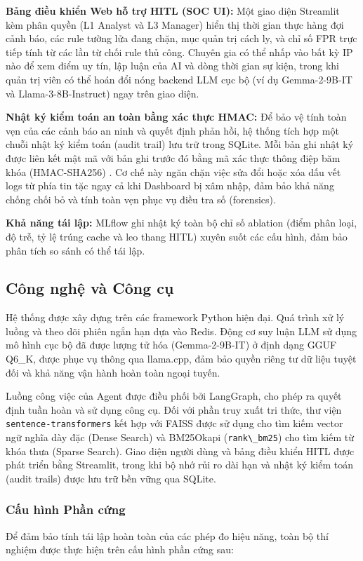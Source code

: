 \documentclass[12pt,a4paper]{article}
\begin{document}
\textbf{Bảng điều khiển Web hỗ trợ HITL (SOC UI):} Một giao diện Streamlit kèm phân quyền (L1 Analyst và L3 Manager) hiển thị thời gian thực hàng đợi cảnh báo, các rule tường lửa đang chặn, mục quản trị cách ly, và chỉ số FPR trực tiếp tính từ các lần từ chối rule thủ công. Chuyên gia có thể nhấp vào bất kỳ IP nào để xem điểm uy tín, lập luận của AI và dòng thời gian sự kiện, trong khi quản trị viên có thể hoán đổi nóng backend LLM cục bộ (ví dụ Gemma-2-9B-IT và Llama-3-8B-Instruct) ngay trên giao diện.

\textbf{Nhật ký kiểm toán an toàn bằng xác thực HMAC:} Để bảo vệ tính toàn vẹn của các cảnh báo an ninh và quyết định phản hồi, hệ thống tích hợp một chuỗi nhật ký kiểm toán (audit trail) lưu trữ trong SQLite. Mỗi bản ghi nhật ký được liên kết mật mã với bản ghi trước đó bằng mã xác thực thông điệp băm khóa (HMAC-SHA256) \cite{hmac1997}. Cơ chế này ngăn chặn việc sửa đổi hoặc xóa dấu vết logs từ phía tin tặc ngay cả khi Dashboard bị xâm nhập, đảm bảo khả năng chống chối bỏ và tính toàn vẹn phục vụ điều tra số (forensics).

\textbf{Khả năng tái lập:} MLflow ghi nhật ký toàn bộ chỉ số ablation (điểm phân loại, độ trễ, tỷ lệ trúng cache và leo thang HITL) xuyên suốt các cấu hình, đảm bảo phân tích so sánh có thể tái lập.

\subsection{Công nghệ và Công cụ}
Hệ thống được xây dựng trên các framework Python hiện đại. Quá trình xử lý luồng và theo dõi phiên ngắn hạn dựa vào Redis. Động cơ suy luận LLM sử dụng mô hình cục bộ đã được lượng tử hóa (Gemma-2-9B-IT) ở định dạng GGUF Q6\_K, được phục vụ thông qua llama.cpp, đảm bảo quyền riêng tư dữ liệu tuyệt đối và khả năng vận hành hoàn toàn ngoại tuyến.

Luồng công việc của Agent được điều phối bởi LangGraph, cho phép ra quyết định tuần hoàn và sử dụng công cụ. Đối với phần truy xuất tri thức, thư viện \verb|sentence-transformers| kết hợp với FAISS được sử dụng cho tìm kiếm vector ngữ nghĩa dày đặc (Dense Search) và BM25Okapi (\verb|rank\_bm25|) cho tìm kiếm từ khóa thưa (Sparse Search). Giao diện người dùng và bảng điều khiển HITL được phát triển bằng Streamlit, trong khi bộ nhớ rủi ro dài hạn và nhật ký kiểm toán (audit trails) được lưu trữ bền vững qua SQLite.

\subsubsection{Cấu hình Phần cứng}
Để đảm bảo tính tái lập hoàn toàn của các phép đo hiệu năng, toàn bộ thí nghiệm được thực hiện trên cấu hình phần cứng sau:
\end{document}
